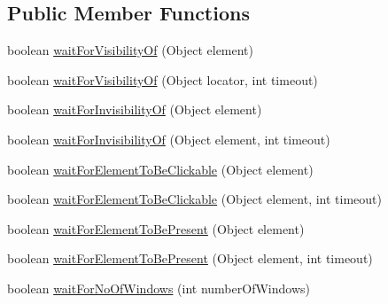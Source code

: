 \subsection*{Public Member Functions}
\begin{DoxyCompactItemize}
\item 
boolean \hyperlink{interfacecom_1_1zeuslearning_1_1automation_1_1interactions_1_1IWaitOperations_ad52fa72b8387c5172714bdec02b754a9}{wait\+For\+Visibility\+Of} (Object element)
\item 
boolean \hyperlink{interfacecom_1_1zeuslearning_1_1automation_1_1interactions_1_1IWaitOperations_a608da544ffa2ea81c99c5cb17e8e60ba}{wait\+For\+Visibility\+Of} (Object locator, int timeout)
\item 
boolean \hyperlink{interfacecom_1_1zeuslearning_1_1automation_1_1interactions_1_1IWaitOperations_a92e178778c5219ee00b59f5d8cdc8f94}{wait\+For\+Invisibility\+Of} (Object element)
\item 
boolean \hyperlink{interfacecom_1_1zeuslearning_1_1automation_1_1interactions_1_1IWaitOperations_a816b3d7ef80895d1cf54cc657a10204e}{wait\+For\+Invisibility\+Of} (Object element, int timeout)
\item 
boolean \hyperlink{interfacecom_1_1zeuslearning_1_1automation_1_1interactions_1_1IWaitOperations_a224899aff622d5bbc4f7e76761413dc9}{wait\+For\+Element\+To\+Be\+Clickable} (Object element)
\item 
boolean \hyperlink{interfacecom_1_1zeuslearning_1_1automation_1_1interactions_1_1IWaitOperations_a8b6cc8c4332c681818630d1665f79c44}{wait\+For\+Element\+To\+Be\+Clickable} (Object element, int timeout)
\item 
boolean \hyperlink{interfacecom_1_1zeuslearning_1_1automation_1_1interactions_1_1IWaitOperations_a37e642af4e56132b564fa67e34e973d4}{wait\+For\+Element\+To\+Be\+Present} (Object element)
\item 
boolean \hyperlink{interfacecom_1_1zeuslearning_1_1automation_1_1interactions_1_1IWaitOperations_a768e53257a1c960d74e048b1aa5fe145}{wait\+For\+Element\+To\+Be\+Present} (Object element, int timeout)
\item 
boolean \hyperlink{interfacecom_1_1zeuslearning_1_1automation_1_1interactions_1_1IWaitOperations_a609fd66e35b8217e83f499999785b370}{wait\+For\+No\+Of\+Windows} (int number\+Of\+Windows)
\item 
\hypertarget{interfacecom_1_1zeuslearning_1_1automation_1_1interactions_1_1IWaitOperations_a27886e71d66cc30d3976fe1042b32ac9}{}\label{interfacecom_1_1zeuslearning_1_1automation_1_1interactions_1_1IWaitOperations_a27886e71d66cc30d3976fe1042b32ac9} 

\end{DoxyCompactItemize}
